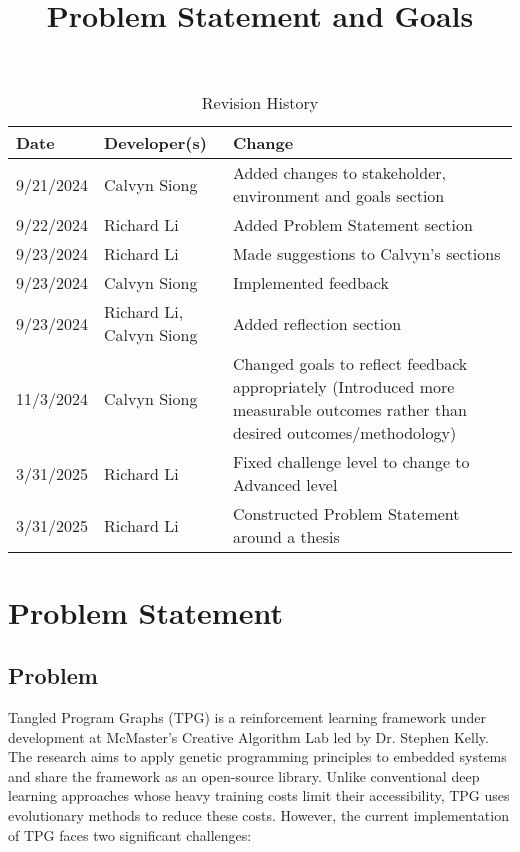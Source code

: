 \documentclass{article}
\title{Problem Statement and Goals\\\progname}
\author{\authname}
\date{}
\begin{document}
\maketitle

\begin{table}[hp]
\caption{Revision History} \label{TblRevisionHistory}
\begin{tabularx}{\textwidth}{llX}
\toprule
\textbf{Date} & \textbf{Developer(s)} & \textbf{Change}\\
\midrule
9/21/2024 & Calvyn Siong & Added changes to stakeholder, environment and goals section \\
9/22/2024 & Richard Li & Added Problem Statement section \\
9/23/2024 & Richard Li & Made suggestions to Calvyn's sections \\
9/23/2024 & Calvyn Siong & Implemented feedback \\
9/23/2024 & Richard Li, Calvyn Siong & Added reflection section \\
11/3/2024 & Calvyn Siong & Changed goals to reflect feedback appropriately (Introduced more measurable outcomes rather than desired outcomes/methodology) \\
3/31/2025 & Richard Li & Fixed challenge level to change to Advanced level \\
3/31/2025 & Richard Li & Constructed Problem Statement around a thesis \\

\bottomrule
\end{tabularx}
\end{table}

\section{Problem Statement}

\subsection{Problem}

Tangled Program Graphs (TPG) is a reinforcement learning framework under development at McMaster’s Creative Algorithm Lab led by Dr. Stephen Kelly. The research aims to apply genetic programming principles to embedded systems and share the framework as an open-source library. Unlike conventional deep learning approaches whose heavy training costs limit their accessibility, TPG uses evolutionary methods to reduce these costs. However, the current implementation of TPG faces two significant challenges:
\end{document}
